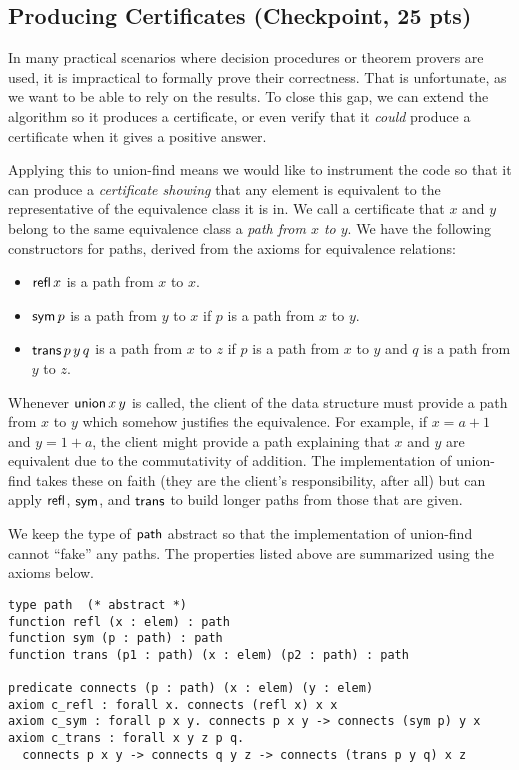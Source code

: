 \documentclass[11pt]{article}
\begin{document}
\subsection{Producing Certificates (Checkpoint, 25 pts)}

In many practical scenarios where decision procedures or theorem provers
are used, it is impractical to formally prove their correctness.  That
is unfortunate, as we want to be able to rely on the results.  To close
this gap, we can extend the algorithm so it produces a certificate, or
even verify that it \emph{could} produce a certificate when it gives a
positive answer.

Applying this to union-find means we would like to instrument the code
so that it can produce a \emph{certificate showing} that any element is
equivalent to the representative of the equivalence class it is in.  We
call a certificate that $x$ and $y$ belong to the same equivalence class a
\emph{path from $x$ to $y$}.  We have the following constructors for
paths, derived from the axioms for equivalence relations:
\begin{itemize}
\item $\mathsf{refl}\, x$ is a path from $x$ to $x$.
\item $\mathsf{sym}\, p$ is a path from $y$ to $x$ if $p$ is a path from $x$ to $y$.
\item $\mathsf{trans}\, p\, y\, q$ is a path from $x$ to $z$ if $p$ is a
  path from $x$ to $y$ and $q$ is a path from $y$ to $z$.
\end{itemize}
Whenever $\mathsf{union}\, x\, y$ is called, the client of the data
structure must provide a path from $x$ to $y$ which somehow justifies
the equivalence.  For example, if $x = a + 1$ and $y = 1 + a$, the
client might provide a path explaining that $x$ and $y$ are equivalent
due to the commutativity of addition.  The implementation of
union-find takes these on faith (they are the client's responsibility,
after all) but can apply $\mathsf{refl}$, $\mathsf{sym}$, and $\mathsf{trans}$ to
build longer paths from those that are given.

We keep the type of $\mathsf{path}$ abstract so that the implementation of
union-find cannot ``fake'' any paths.  The properties listed above are
summarized using the axioms below.
\begin{lstlisting}
type path  (* abstract *)
function refl (x : elem) : path
function sym (p : path) : path
function trans (p1 : path) (x : elem) (p2 : path) : path

predicate connects (p : path) (x : elem) (y : elem)
axiom c_refl : forall x. connects (refl x) x x
axiom c_sym : forall p x y. connects p x y -> connects (sym p) y x
axiom c_trans : forall x y z p q.
  connects p x y -> connects q y z -> connects (trans p y q) x z
\end{lstlisting}
\end{document}

